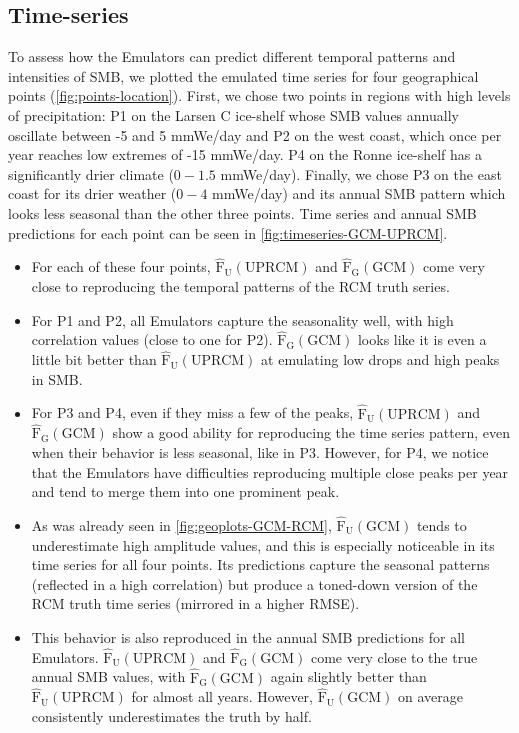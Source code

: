 \documentclass[a4paper,11pt,oneside]{report}
\begin{document}
\subsection{Time-series}\label{sec:res-time-series}
To assess how the Emulators can predict different temporal patterns and intensities of SMB, we plotted the emulated time series for four geographical points (\autoref{fig:points-location}). First, we chose two points in regions with high levels of precipitation: P1 on the Larsen C ice-shelf whose SMB values annually oscillate between -5 and 5 \si{mmWe/day} and P2 on the west coast, which once per year reaches low extremes of -15 \si{mmWe/day}. P4 on the Ronne ice-shelf has a significantly drier climate ($0-1.5$ \si{mmWe/day}). Finally, we chose P3 on the east coast for its drier weather ($0-4$ \si{mmWe/day}) and its annual SMB pattern which looks less seasonal than the other three points. Time series and annual SMB predictions for each point can be seen in \autoref{fig:timeseries-GCM-UPRCM}. 
\begin{itemize}
    \item For each of these four points, $\mathrm{\hat{F}_{U}(UPRCM)}$ and $\mathrm{\hat{F}_{G}(GCM)}$ come very close to reproducing the temporal patterns of the RCM truth series. 
    \item For P1 and P2, all Emulators capture the seasonality well, with high correlation values (close to one for P2). $\mathrm{\hat{F}_{G}(GCM)}$ looks like it is even a little bit better than $\mathrm{\hat{F}_{U}(UPRCM)}$ at emulating low drops and high peaks in SMB. 
    \item For P3 and P4, even if they miss a few of the peaks, $\mathrm{\hat{F}_{U}(UPRCM)}$ and $\mathrm{\hat{F}_{G}(GCM)}$ show a good ability for reproducing the time series pattern, even when their behavior is less seasonal, like in P3. However, for P4, we notice that the Emulators have difficulties reproducing multiple close peaks per year and tend to merge them into one prominent peak. 
    \item As was already seen in \autoref{fig:geoplots-GCM-RCM}, $\mathrm{\hat{F}_{U}(GCM)}$ tends to underestimate high amplitude values, and this is especially noticeable in its time series for all four points. Its predictions capture the seasonal patterns (reflected in a high correlation) but produce a toned-down version of the RCM truth time series (mirrored in a higher RMSE).
    \item This behavior is also reproduced in the annual SMB predictions for all Emulators. $\mathrm{\hat{F}_{U}(UPRCM)}$ and $\mathrm{\hat{F}_{G}(GCM)}$ come very close to the true annual SMB values, with $\mathrm{\hat{F}_{G}(GCM)}$ again slightly better than $\mathrm{\hat{F}_{U}(UPRCM)}$ for almost all years. However, $\mathrm{\hat{F}_{U}(GCM)}$ on average consistently underestimates the truth by half. 

\end{itemize}
\end{document}
